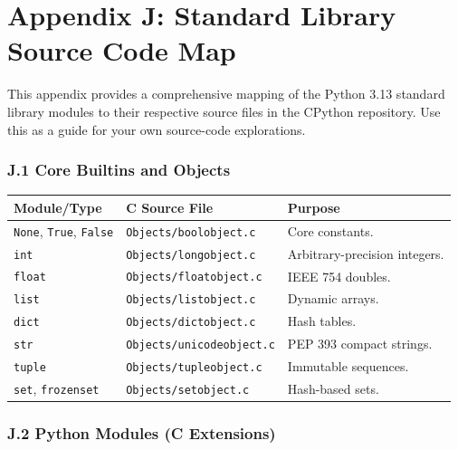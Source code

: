 \hypertarget{appendix-j-standard-library-source-code-map}{%
\chapter{Appendix J: Standard Library Source Code
Map}\label{appendix-j-standard-library-source-code-map}}

This appendix provides a comprehensive mapping of the Python 3.13
standard library modules to their respective source files in the CPython
repository. Use this as a guide for your own source-code explorations.

\hypertarget{j.1-core-builtins-and-objects}{%
\subsection{J.1 Core Builtins and
Objects}\label{j.1-core-builtins-and-objects}}

\begin{longtable}[]{@{}lll@{}}
\toprule
Module/Type & C Source File & Purpose \\
\midrule
\endhead
\passthrough{\lstinline!None!}, \passthrough{\lstinline!True!},
\passthrough{\lstinline!False!} &
\passthrough{\lstinline!Objects/boolobject.c!} & Core constants. \\
\passthrough{\lstinline!int!} &
\passthrough{\lstinline!Objects/longobject.c!} & Arbitrary-precision
integers. \\
\passthrough{\lstinline!float!} &
\passthrough{\lstinline!Objects/floatobject.c!} & IEEE 754 doubles. \\
\passthrough{\lstinline!list!} &
\passthrough{\lstinline!Objects/listobject.c!} & Dynamic arrays. \\
\passthrough{\lstinline!dict!} &
\passthrough{\lstinline!Objects/dictobject.c!} & Hash tables. \\
\passthrough{\lstinline!str!} &
\passthrough{\lstinline!Objects/unicodeobject.c!} & PEP 393 compact
strings. \\
\passthrough{\lstinline!tuple!} &
\passthrough{\lstinline!Objects/tupleobject.c!} & Immutable
sequences. \\
\passthrough{\lstinline!set!}, \passthrough{\lstinline!frozenset!} &
\passthrough{\lstinline!Objects/setobject.c!} & Hash-based sets. \\
\bottomrule
\end{longtable}

\hypertarget{j.2-python-modules-c-extensions}{%
\subsection{J.2 Python Modules (C
Extensions)}\label{j.2-python-modules-c-extensions}}

